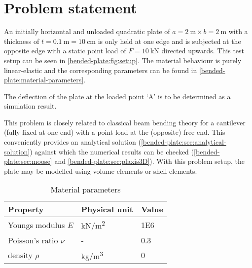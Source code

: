 \section{Problem statement}
\label{bended-plate:sec:problem-statement}

An initially horizontal and unloaded quadratic plate of $a = \qty{2}{\metre}
    \times b = \qty{2}{\metre}$ with a thickness of $t = \qty{0.1}{\metre} =
    \qty{10}{\centi\metre}$ is only held at one edge and is subjected at the
opposite edge with a static point load of $F = \qty{10}{\kilo\newton}$ directed
upwards. This test setup can be seen in \autoref{bended-plate:fig:setup}. The
material behaviour is purely linear-elastic and the corresponding parameters
can be found in \autoref{bended-plate:material-parameters}.

The deflection of the plate at the loaded point ‘A’ is to be determined as a
simulation result.

This problem is closely related to classical beam bending theory for a
cantilever (fully fixed at one end) with a point load at the (opposite) free
end. This conveniently provides an analytical solution
(\autoref{bended-plate:sec:analytical-solution}) against which the numerical
results can be checked (\autoref{bended-plate:sec:moose} and
\autoref{bended-plate:sec:plaxis3D}). With this problem setup, the plate may be
modelled using volume elements or shell elements.

\begin{table}[htbp]
    \centering
    \caption{Material parameters}
    \label{bended-plate:material-parameters}
    \begin{tabularx}{\textwidth}{XYY}

        \hline

        Property              & Physical unit                                         & Value      \\

        \hline

        Youngs modulus $E$    & \si[per-mode = symbol]{\kilo\newton\per\square\metre} &
        \SI{1E6}{}                                                                                 \\

        Poisson's ratio $\nu$ & -                                                     & \SI{0.3}{} \\

        density $\rho$        & \si[per-mode = symbol]{\kilogram\per\cubic\metre}     & \SI{0}{}
        \\

        \hline
    \end{tabularx}
\end{table}

